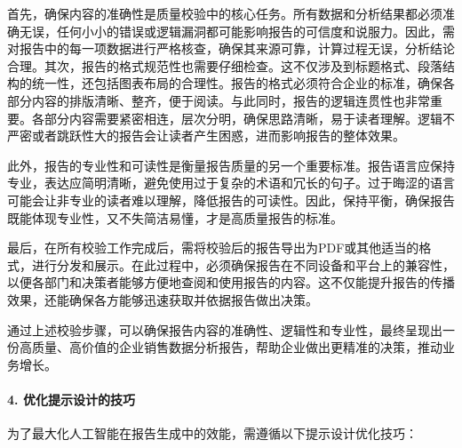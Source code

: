 首先，确保内容的准确性是质量校验中的核心任务。所有数据和分析结果都必须准确无误，任何小小的错误或逻辑漏洞都可能影响报告的可信度和说服力。因此，需对报告中的每一项数据进行严格核查，确保其来源可靠，计算过程无误，分析结论合理。其次，报告的格式规范性也需要仔细检查。这不仅涉及到标题格式、段落结构的统一性，还包括图表布局的合理性。报告的格式必须符合企业的标准，确保各部分内容的排版清晰、整齐，便于阅读。与此同时，报告的逻辑连贯性也非常重要。各部分内容需要紧密相连，层次分明，确保思路清晰，易于读者理解。逻辑不严密或者跳跃性大的报告会让读者产生困惑，进而影响报告的整体效果。

此外，报告的专业性和可读性是衡量报告质量的另一个重要标准。报告语言应保持专业，表达应简明清晰，避免使用过于复杂的术语和冗长的句子。过于晦涩的语言可能会让非专业的读者难以理解，降低报告的可读性。因此，保持平衡，确保报告既能体现专业性，又不失简洁易懂，才是高质量报告的标准。

最后，在所有校验工作完成后，需将校验后的报告导出为PDF或其他适当的格式，进行分发和展示。在此过程中，必须确保报告在不同设备和平台上的兼容性，以便各部门和决策者能够方便地查阅和使用报告的内容。这不仅能提升报告的传播效果，还能确保各方能够迅速获取并依据报告做出决策。

通过上述校验步骤，可以确保报告内容的准确性、逻辑性和专业性，最终呈现出一份高质量、高价值的企业销售数据分析报告，帮助企业做出更精准的决策，推动业务增长。

\paragraph{4. 优化提示设计的技巧}

为了最大化人工智能在报告生成中的效能，需遵循以下提示设计优化技巧：

